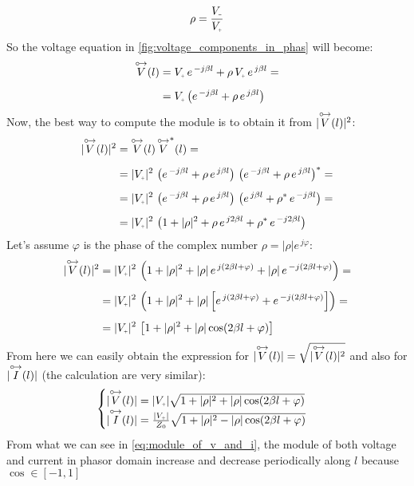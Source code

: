 \begin{equation*}
    \rho= \frac{V\bottomMinus}{V\bottomPlus}
\end{equation*}
So the voltage equation in \cref{fig:voltage_components_in_phas} will become:
\begin{align}
    \begin{split}
        \phas{V}(l) &= V\bottomPlus \,e^{\,-j\beta l}+\rho\, V\bottomPlus \,e^{\,j\beta l}=\\[5pt]
        &= V\bottomPlus \left(e^{\,-j\beta l}+\rho \, e^{\,j\beta l}\right)
    \end{split}
\end{align}
Now, the best way to compute the module is to obtain it from $|\overset{\mathbin {{\circ \mkern-2.5mu\rightarrow}}}{V}(l)|^2$:
\begin{align}
    \begin{split}
        |\phas{V}(l)|^2 &= \phas{V}(l)\,\phas{V}^*(l) =\\[5pt]
        &=|V\bottomPlus|^2\,\left(e^{\,-j\beta l}+\rho \, e^{\,j\beta l}\right)\,\left(e^{\,-j\beta l}+\rho \, e^{\,j\beta l}\right)^*=\\[5pt]
        &= |V\bottomPlus|^2\,\left(e^{\,-j\beta l}+\rho \, e^{\,j\beta l}\right)\,\left(e^{\,j\beta l}+\rho^* \, e^{\,-j\beta l}\right)=\\[5pt]
        &=|V\bottomPlus|^2\,\left(1+|\rho|^2+\rho\,e^{\,j2\beta l}+\rho^* \, e^{\,-j2\beta l}\right)
    \end{split}
\end{align}
Let's assume $\varphi $ is the phase of the complex number $\rho=|\rho|e^{\,j\varphi}$:
\begin{align}
    \begin{split}
        |\phas{V}(l)|^2 &=|V\bottomPlus|^2\,\left(1+|\rho|^2+|\rho|\,e^{\,j(2\beta l+\varphi)}+|\rho| \, e^{\,-j(2\beta l+\varphi)}\right)=\\[5pt]
        &=|V\bottomPlus|^2\,\left(1+|\rho|^2+|\rho|\left[e^{\,j(2\beta l+\varphi)}+ e^{\,-j(2\beta l+\varphi)}\right]\right)=\\[5pt]
        &=|V\bottomPlus|^2\,\left[  1+|\rho|^2+|\rho|\cos(2\beta l+\varphi)  \right]
    \end{split}
\end{align}
From here we can easily obtain the expression for $|\overset{\mathbin {{\circ \mkern-2.5mu\rightarrow}}}{V}(l)|=\sqrt{|\overset{\mathbin {{\circ \mkern-2.5mu\rightarrow}}}{V}(l)|^2}$ and also for $|\overset{\mathbin {{\circ \mkern-2.5mu\rightarrow}}}{I}(l)|$ (the calculation are very similar):
\begin{equation}
    \begin{cases}
        |\phas{V}(l)| =|V\bottomPlus|\sqrt{1+|\rho|^2+|\rho|\cos(2\beta l+\varphi)}\\
        |\phas{I}(l)| =\frac{|V\bottomPlus|}{Z_0}\sqrt{1+|\rho|^2-|\rho|\cos(2\beta l+\varphi)}
    \end{cases}\label{eq:module_of_v_and_i}
\end{equation}
From what we can see in \cref{eq:module_of_v_and_i}, the module of both voltage and current in phasor domain increase and decrease periodically along $l$ because $\cos \in [-1,1]$
